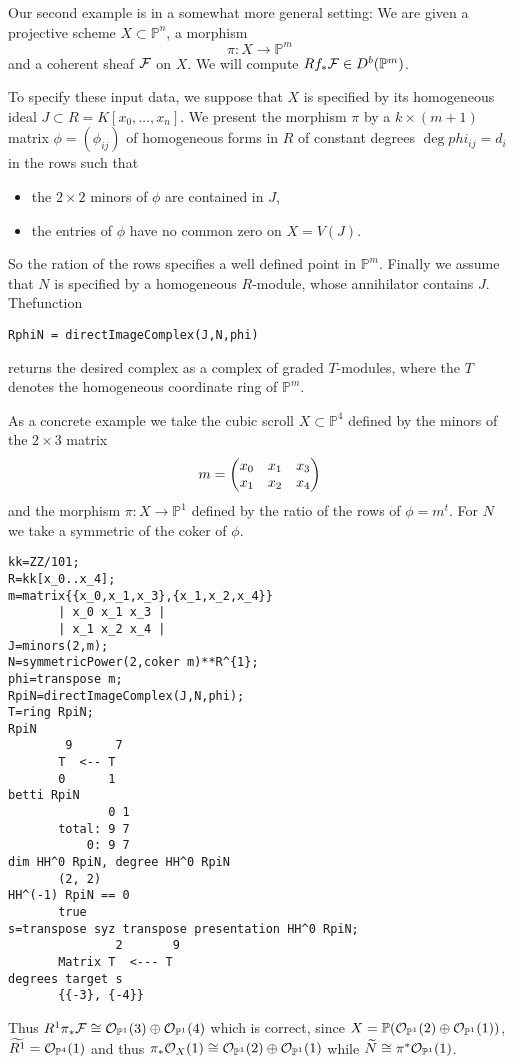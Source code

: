 \documentclass[twoside,12pt, leqno]{amsart}
\def\PP{{\mathbb P}}
\begin{document}
Our second example is in a somewhat more general setting: We are given a projective scheme $X \subset \PP^n$, a morphism
$$\pi \colon X \to \PP^m$$ and a coherent sheaf ${\mathcal F}$ on $X$. We will compute $Rf_* \sF \in D^b(\PP^m)$.

To specify these input data, we suppose that $X$ is specified by its homogeneous ideal $J \subset R = K[x_0,\ldots,x_n]$. 
We present the morphism $\pi$ by a $k \times (m+1)$ matrix $\phi=(\phi_{ij})$ of homogeneous forms in $R$ of constant degrees  $\deg phi_{ij} = d_i$ in the rows such that
\begin{itemize}
\item the $2\times 2$ minors of $\phi$ are contained in $J$,
\item the entries of $\phi$ have no common zero on $X=V(J)$.
\end{itemize}
So the ration of the rows specifies a well defined point in $\PP^m$. Finally we assume that $N$ is specified by a homogeneous $R$-module,
whose annihilator contains $J$. Thefunction
\begin{verbatim}
RphiN = directImageComplex(J,N,phi)
\end{verbatim} 
returns the desired complex as a complex of graded $T$-modules, where the $T$ denotes  the homogeneous coordinate ring of $\PP^m$.

As a concrete example we take the cubic scroll $X \subset \PP^4$ defined by the minors of the $2\times 3$ matrix
$$
m=\begin{pmatrix}
x_0& x_1 & x_3 \cr
x_1 & x_2 & x_4 \cr
\end{pmatrix}   
$$
and the morphism $\pi :X \to \PP^1$ defined by the ratio of the rows of $\phi=m^t$. For $N$ we take a symmetric of the coker of $\phi$.
{\small\begin{verbatim}
kk=ZZ/101;
R=kk[x_0..x_4];
m=matrix{{x_0,x_1,x_3},{x_1,x_2,x_4}}
       | x_0 x_1 x_3 |
       | x_1 x_2 x_4 |
J=minors(2,m);
N=symmetricPower(2,coker m)**R^{1};
phi=transpose m;
RpiN=directImageComplex(J,N,phi);
T=ring RpiN;
RpiN
        9      7
       T  <-- T               
       0      1
betti RpiN
              0 1
       total: 9 7
           0: 9 7
dim HH^0 RpiN, degree HH^0 RpiN
       (2, 2)
HH^(-1) RpiN == 0
       true
s=transpose syz transpose presentation HH^0 RpiN;
               2       9
       Matrix T  <--- T
degrees target s
       {{-3}, {-4}} 
\end{verbatim} }
Thus $R^1\pi_* \sF \cong \sO_{\PP^1}(3) \oplus \sO_{\PP^1}(4)$ which is correct, since  $X= \PP(\sO_{\PP^1}(2) \oplus \sO_{\PP^1}(1))$, $\widetilde{R^{1}}=\sO_{\PP^4}(1)$ and thus $\pi_* \sO_X(1)\cong \sO_{\PP^1}(2) \oplus \sO_{\PP^1}(1)$ while $\widetilde N \cong \pi^*\sO_{\PP^1}(1)$.
\end{document}
